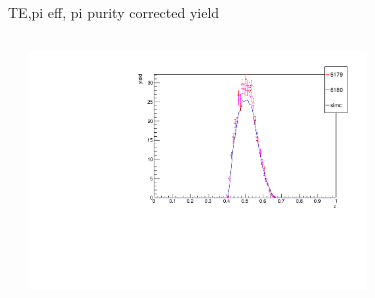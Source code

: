 \begin{frame}{TE,pi eff, pi purity corrected yield}
\begin{columns}
\begin{column}[T]{0.5\textwidth}
\end{column}
\begin{column}[T]{0.5\textwidth}
\includegraphics[width = 0.7\textwidth]{results/yield/check/yieldcheck_130_pos.pdf}
\end{column}
\end{columns}
\end{frame}
